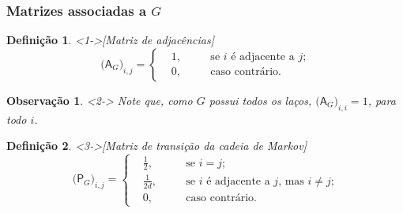 \documentclass{beamer}
\def\matriz#1{\mathsf{#1}}
\theoremstyle{teoaxicorlem}
\theoremstyle{defnotnom}
\newtheorem{Def}{Definição}
\newtheorem{Obs}{Observação}
\begin{document}
\begin{frame}
  \frametitle{Matrizes associadas a $G$}
  \footnotesize
  \begin{Def}<1->[Matriz de adjacências]
    \begin{equation*}
      {\bigl({\matriz A}_G\bigr)}_{i,j} = \left\{
        \begin{aligned}
          &1, &\quad &\text{se $i$ é adjacente a $j$;}\\
          &0, &\quad &\text{caso contrário.}
        \end{aligned}
      \right.
    \end{equation*}
  \end{Def}
  \vfill
  \begin{Obs}<2->
    Note que, como $G$ possui todos os laços,
    ${\bigl({\matriz A}_G\bigr)}_{i,i}=1$, para todo $i$.
  \end{Obs}
  \vfill
  \begin{Def}<3->[Matriz de transição da cadeia de Markov]
    \begin{equation*}
      {\bigl({\matriz P}_G\bigr)}_{i,j} = \left\{
        \begin{aligned}
          &\frac12, &\quad &\text{se $i=j$;}\\
          &\frac1{2d}, &\quad &\text{se $i$ é adjacente a $j$, mas
            $i\neq j$;}\\
          &0, &\quad &\text{caso contrário.}
        \end{aligned}
      \right.
    \end{equation*}
  \end{Def}
\end{frame}
\end{document}
